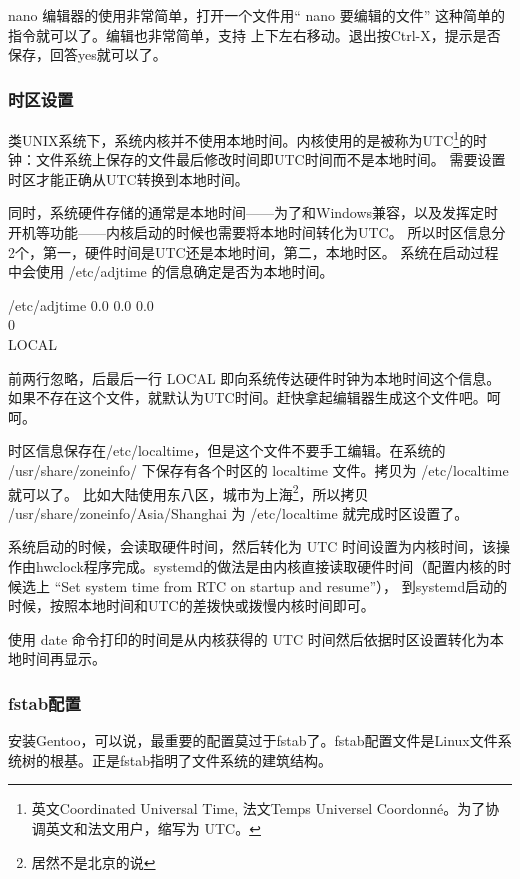 nano 编辑器的使用非常简单，打开一个文件用“ nano 要编辑的文件” 这种简单的指令就可以了。编辑也非常简单，支持
\textuparrow{} \textdownarrow{} \textleftarrow{} \textrightarrow{} 上下左右移动。退出按Ctrl-X，提示是否保存，回答yes就可以了。


\subsubsection{时区设置}

类UNIX系统下，系统内核并不使用本地时间。内核使用的是被称为UTC\footnote{英文Coordinated Universal Time, 法文Temps Universel Coordonné。为了协调英文和法文用户，缩写为 UTC。}的时钟：文件系统上保存的文件最后修改时间即UTC时间而不是本地时间。
需要设置时区才能正确从UTC转换到本地时间。

同时，系统硬件存储的通常是本地时间——为了和Windows兼容，以及发挥定时开机等功能——内核启动的时候也需要将本地时间转化为UTC。
所以时区信息分2个，第一，硬件时间是UTC还是本地时间，第二，本地时区。
系统在启动过程中会使用 /etc/adjtime 的信息确定是否为本地时间。

\begin{filecontent}{/etc/adjtime}
0.0 0.0 0.0\\
0\\
LOCAL
\end{filecontent}

前两行忽略，后最后一行 LOCAL 即向系统传达硬件时钟为本地时间这个信息。如果不存在这个文件，就默认为UTC时间。赶快拿起编辑器生成这个文件吧。呵呵。

时区信息保存在/etc/localtime，但是这个文件不要手工编辑。在系统的 /usr/share/zoneinfo/ 下保存有各个时区的 localtime 文件。拷贝为 /etc/localtime 就可以了。
比如大陆使用东八区，城市为上海\footnote{居然不是北京的说}，所以拷贝 /usr/share/zoneinfo/Asia/Shanghai 为 /etc/localtime 就完成时区设置了。

系统启动的时候，会读取硬件时间，然后转化为 UTC 时间设置为内核时间，该操作由hwclock程序完成。systemd的做法是由内核直接读取硬件时间（配置内核的时候选上 “Set system time from RTC on startup and resume”）， 到systemd启动的时候，按照本地时间和UTC的差拨快或拨慢内核时间即可。

使用 date 命令打印的时间是从内核获得的 UTC 时间然后依据时区设置转化为本地时间再显示。

\subsubsection{fstab配置}
安装Gentoo，可以说，最重要的配置莫过于fstab了。fstab配置文件是Linux文件系统树的根基。正是fstab指明了文件系统的建筑结构。

